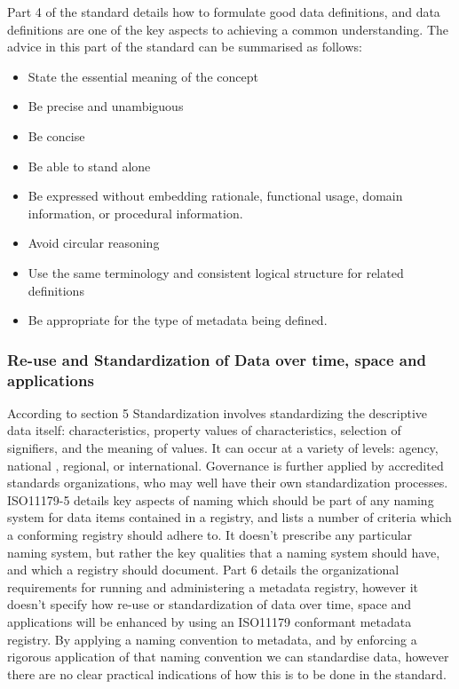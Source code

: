 \documentclass{llncs}
\begin{document}
Part 4 of the standard details how to formulate good data definitions, and data definitions are one of the key aspects to achieving a common understanding. The advice in this part of the standard can be summarised as follows: 
\begin{itemize}
\item State the essential meaning of the concept
\item Be precise and unambiguous
\item Be concise
\item Be able to stand alone
\item Be expressed without embedding rationale, functional usage, domain information, or procedural information.
\item Avoid circular reasoning
\item Use the same terminology and consistent logical structure for related definitions
\item Be appropriate for the type of metadata being defined.
\end{itemize}

\subsubsection{Re-use and Standardization of Data over time, space and applications}

According to section 5 Standardization involves standardizing the descriptive data itself: characteristics, property values of characteristics, selection of signifiers, and the meaning of values.  It can occur at a variety of levels: agency, national , regional, or international. Governance is further applied by accredited standards organizations, who may well have their own standardization processes. ISO11179-5 details key aspects of naming which should be part of any naming system for data items contained in a registry, and lists a number of criteria which a conforming registry should adhere to. It doesn't prescribe any particular naming system, but rather the key qualities that a naming system should have, and which a registry should document. Part 6 details the organizational requirements for running and administering a metadata registry, however it doesn't specify how re-use or standardization of data over time, space and applications will be enhanced by using an ISO11179 conformant metadata registry. By applying a naming convention to metadata, and by enforcing a rigorous application of that naming convention we can standardise data, however there are no clear practical indications of how this is to be done in the standard.
\end{document}
